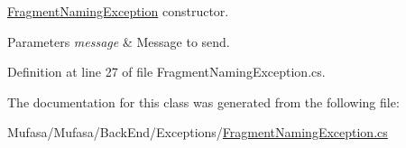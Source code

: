 \hyperlink{class_mufasa_1_1_back_end_1_1_exceptions_1_1_fragment_naming_exception}{Fragment\+Naming\+Exception} constructor. 


\begin{DoxyParams}{Parameters}
{\em message} & Message to send.\\
\hline
\end{DoxyParams}


Definition at line 27 of file Fragment\+Naming\+Exception.\+cs.



The documentation for this class was generated from the following file\+:\begin{DoxyCompactItemize}
\item 
Mufasa/\+Mufasa/\+Back\+End/\+Exceptions/\hyperlink{_fragment_naming_exception_8cs}{Fragment\+Naming\+Exception.\+cs}\end{DoxyCompactItemize}
